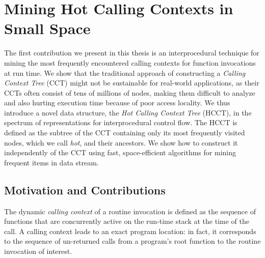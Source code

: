 
\section{Mining Hot Calling Contexts in Small Space}


The first contribution we present in this thesis is an interprocedural technique for mining the most frequently encountered calling contexts for function invocations at run time. We show that the traditional approach of constructing a {\em Calling Context Tree} (CCT) might not be sustainable for real-world applications, as their CCTs often consist of tens of millions of nodes, making them difficult to analyze and also hurting execution time because of poor access locality. We thus introduce a novel data structure, the {\em Hot Calling Context Tree} (HCCT), in the spectrum of representations for interprocedural control flow. The HCCT is defined as the subtree of the CCT containing only its most frequently visited nodes, which we call {\em hot}, and their ancestors. We show how to construct it independently of the CCT using fast, space-efficient algorithms for mining frequent items in data stream.

\subsection{Motivation and Contributions}
The dynamic {\em calling context} of a routine invocation is defined as the sequence of functions that are concurrently active on the run-time stack  at the time of the call. A calling context leads to an exact program location: in fact, it corresponds to the sequence of un-returned calls from a program’s root function to the routine invocation of interest.

